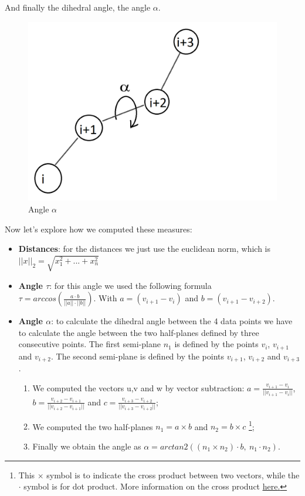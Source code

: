\pagebreak
And finally the dihedral angle, the angle $\alpha$.

\begin{figure}[h!]
    \centering
    \includegraphics[scale=0.45]{res/dev/angleAlpha.png}
    \caption{Angle $\alpha$}
    \label{fig:enter-label}
\end{figure}

Now let's explore how we computed these measures:
\begin{itemize}
    \item \textbf{Distances}: for the distances we just use the euclidean norm, which is \\ {$||x||_2 = \sqrt{x_1^2 + ... + x_n^2}$}
    \item \textbf{Angle $\tau$}: for this angle we used the following formula \\ $\tau = arccos(\frac{a \cdot b}{||a|| \cdot ||b||})$. With $a = (v_{i+1}-v_i)$ and $b = (v_{i+1}-v_{i+2})$.  
    \item \textbf{Angle $\alpha$}: to calculate the dihedral angle between the 4 data points we have to calculate the angle between the two half-planes defined by three consecutive points. The first semi-plane $n_1$ is defined by the points $v_i$, $v_{i+1}$ and $v_{i+2}$. The second semi-plane is defined by the points $v_{i+1}$, $v_{i+2}$ and $v_{i+3}$.

    \pagebreak

    \begin{enumerate}
            \item We computed the vectors u,v and w by vector subtraction: $a = \frac{v_{i+1}-v_i}{||v_{i+1}-v_i||}$, $b = \frac{v_{i+2}-v_{i+1}}{||v_{i+2}-v_{i+1}||}$ and $c = \frac{v_{i+3}-v_{i+2}}{||v_{i+3}-v_{i+2}||}$;
            \item We computed the two half-planes $n_1 = a \times b$ and $n_2 = b \times c$ \footnote{This $\times$ symbol is to indicate the cross product between two vectors, while the $\cdot$ symbol is for dot product. More information on the cross product \href{https://en.wikipedia.org/wiki/Cross\_product}{\underline{here}.}};
            \item Finally we obtain the angle as $\alpha = arctan2((n_1\times n_2)\cdot b,\ n_1\cdot n_2)$.
    \end{enumerate}
\end{itemize}

